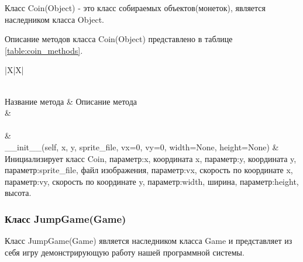 Класс Coin(Object) - это класс собираемых объектов(монеток), является наследником класса Object.

Описание методов класса Coin(Object) представлено в таблице \ref{table:coin_methods}.

\begin{xltabular}{\textwidth}{|X|X|}
	\caption{Методы класса Coin(Object)}\label{table:coin_methods} \\
	\hline \centrow
	Название метода & \centrow  Описание метода \\
	\hline {} &  \\ \hline
	\endfirsthead
	\\
	\hline {} &  \\ \hline
	\finishhead
	 \_\_init\_\_(self, x, y, sprite\_file, vx=0, vy=0, width=None, height=None) & Инициализирует класс Coin, параметр:x, координата x, параметр:y, координата y, параметр:sprite\_file, файл изображения, параметр:vx, скорость по координате x, параметр:vy, скорость по координате y, параметр:width, ширина, параметр:height, высота. \\
	\hline
\end{xltabular}

\subsubsection{Класс JumpGame(Game)}

Класс JumpGame(Game) является наследником класса Game и представляет из себя игру демонстрирующую работу нашей программной системы.

